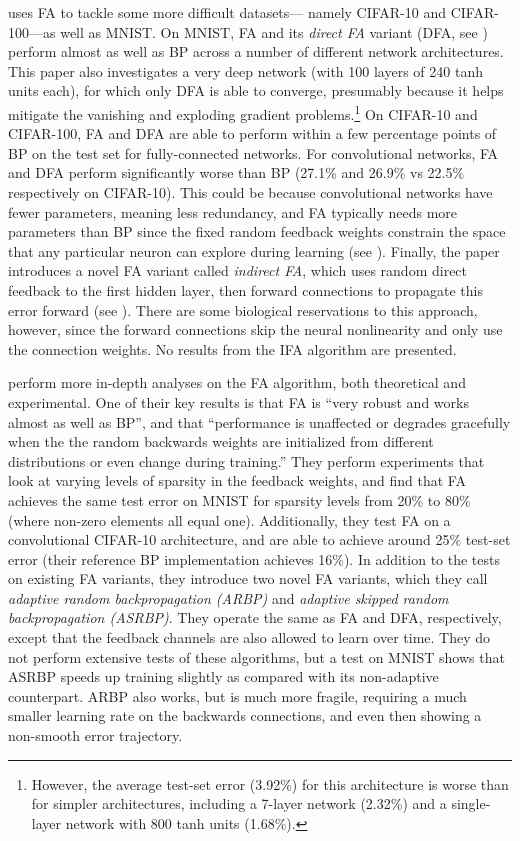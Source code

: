 \textcite{Nokland2016} uses FA to tackle some more difficult datasets---%
namely CIFAR-10 and CIFAR-100---as well as MNIST.
On MNIST, FA and its \emph{direct FA} variant (DFA, see )
perform almost as well as BP across a number of different network architectures.
This paper also investigates a very deep network (with 100 layers of 240 tanh units each),
for which only DFA is able to converge,
presumably because it helps mitigate
the vanishing and exploding gradient problems.\footnote{
  However, the average test-set error (3.92\%) for this architecture
  is worse than for simpler architectures,
  including a 7-layer network (2.32\%)
  and a single-layer network with 800 tanh units (1.68\%).}
On CIFAR-10 and CIFAR-100,
FA and DFA are able to perform within a few percentage points
of BP on the test set for fully-connected networks.
For convolutional networks, FA and DFA perform significantly worse than BP
(27.1\% and 26.9\% vs 22.5\% respectively on CIFAR-10).
This could be because convolutional networks have fewer parameters,
meaning less redundancy,
and FA typically needs more parameters than BP
since the fixed random feedback weights
constrain the space that any particular neuron can explore during learning
(see ).
Finally, the paper introduces a novel FA variant called \emph{indirect FA},
which uses random direct feedback to the first hidden layer,
then forward connections to propagate this error forward (see ).
There are some biological reservations to this approach, however,
since the forward connections skip the neural nonlinearity
and only use the connection weights.
No results from the IFA algorithm are presented.

\textcite{Baldi2016} perform more in-depth analyses on the FA algorithm,
both theoretical and experimental.
One of their key results is that FA is ``very robust
and works almost as well as BP'', and that
``performance is unaffected or degrades gracefully
when the the random backwards weights are initialized from different
distributions or even change during training.''
They perform experiments that look at varying levels of sparsity
in the feedback weights,
and find that FA achieves the same test error on MNIST
for sparsity levels from 20\% to 80\% (where non-zero elements all equal one).
Additionally, they test FA on a convolutional CIFAR-10 architecture,
and are able to achieve around 25\% test-set error
(their reference BP implementation achieves 16\%).
In addition to the tests on existing FA variants,
they introduce two novel FA variants,
which they call \emph{adaptive random backpropagation (ARBP)}
and \emph{adaptive skipped random backpropagation (ASRBP)}.
They operate the same as FA and DFA, respectively,
except that the feedback channels are also allowed to learn over time.
They do not perform extensive tests of these algorithms,
but a test on MNIST shows that ASRBP speeds up training slightly
as compared with its non-adaptive counterpart.
ARBP also works, but is much more fragile,
requiring a much smaller learning rate on the backwards connections,
and even then showing a non-smooth error trajectory.

